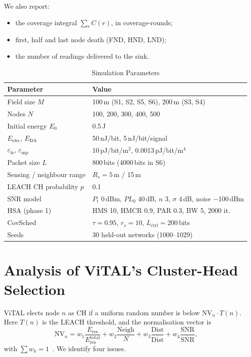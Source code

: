 \documentclass[journal]{IEEEtran}
\begin{document}
We also report:
\begin{itemize}
\item the coverage integral $\sum_r C(r)$, in coverage-rounds;
\item first, half and last node death (FND, HND, LND);
\item the number of readings delivered to the sink.
\end{itemize}

\begin{table}[t]
\caption{Simulation Parameters}\label{tab:params}
\centering\scriptsize
\setlength{\tabcolsep}{4pt}
\begin{tabular}{ll}
\toprule
Parameter & Value\\
\midrule
Field size $M$ & 100\,m (S1, S2, S5, S6), 200\,m (S3, S4)\\
Nodes $N$ & 100, 200, 300, 400, 500\\
Initial energy $E_0$ & 0.5\,J\\
$E_{\mathrm{elec}}$, $E_{\mathrm{DA}}$ & 50\,nJ/bit, 5\,nJ/bit/signal\\
$\varepsilon_{\mathrm{fs}}$, $\varepsilon_{\mathrm{mp}}$ & 10\,pJ/bit/m$^2$, 0.0013\,pJ/bit/m$^4$\\
Packet size $L$ & 800\,bits (4000\,bits in S6)\\
Sensing / neighbour range & $R_s=5$\,m / 15\,m\\
LEACH CH probability $p$ & 0.1\\
SNR model & $P_t$ 0\,dBm, $PL_0$ 40\,dB, $n$ 3, $\sigma$ 4\,dB, noise $-$100\,dBm\\
HSA (phase 1) & HMS 10, HMCR 0.9, PAR 0.3, BW 5, 2000 it.\\
CovSched & $\tau=0.95$, $r_s=10$, $L_{\mathrm{ctrl}}=200$\,bits\\
Seeds & 30 held-out networks (1000--1029)\\
\bottomrule
\end{tabular}
\end{table}

\section{Analysis of ViTAL's Cluster-Head Selection}\label{sec:analysis}
ViTAL elects node $n$ as CH if a uniform random number is below $\mathrm{NV}_n\cdot T(n)$. Here $T(n)$ is the LEACH threshold, and the normalisation vector is
\begin{equation}\label{eq:nv}
\mathrm{NV}_n=w_1\frac{E_{\mathrm{res}}}{E_{\mathrm{res}}^{\mathrm{total}}}+w_2\frac{\mathrm{Neigh}}{N}+w_3\frac{\mathrm{Dist}}{\overline{\mathrm{Dist}}}+w_4\frac{\mathrm{SNR}}{\overline{\mathrm{SNR}}},
\end{equation}
with $\sum w_k=1$~\cite{ali2025vital}. We identify four issues.
\end{document}
